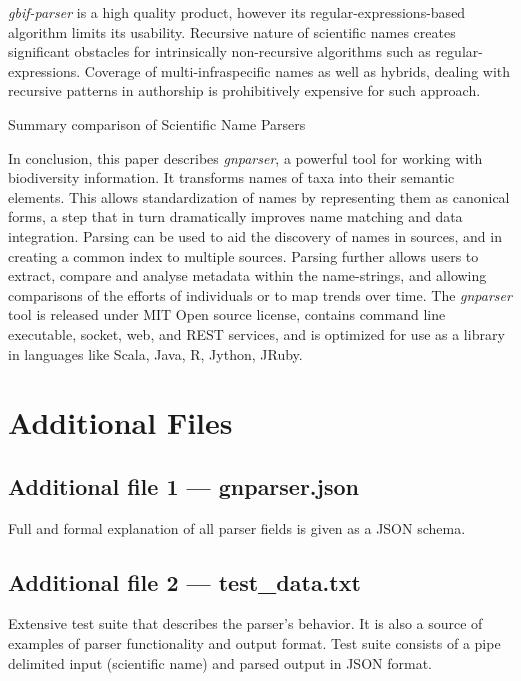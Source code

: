 \documentclass{bmcart}
\begin{document}
\textit{gbif-parser} is a high quality product, however its regular-expressions-based algorithm limits its usability. Recursive nature of scientific names creates significant obstacles for intrinsically non-recursive algorithms such as regular-expressions. Coverage of multi-infraspecific names as well as hybrids, dealing with recursive patterns in authorship is prohibitively expensive for such approach.

\begin{table}[htb]
  \begin{center}
    \caption{Summary comparison of Scientific Name Parsers}
    \label{table:summary}
  \end{center}
\end{table}

In conclusion, this paper describes \textit{gnparser}, a powerful tool for working with biodiversity information. It transforms names of taxa into their semantic elements. This  allows standardization of names by representing them as canonical forms, a step that in turn dramatically improves name matching and data integration. Parsing can be used to aid the discovery of names in sources, and in creating a common index to multiple sources. Parsing further allows users to extract, compare and analyse metadata within the name-strings, and allowing comparisons of the efforts of individuals or to map trends over time. The \textit{gnparser} tool is released under MIT Open source license, contains command line executable, socket, web, and REST services, and is optimized for use as a library in languages like Scala, Java, R, Jython, JRuby.

\section*{Additional Files}

  \subsection*{Additional file 1 --- gnparser.json} Full and formal explanation of all parser fields is given as a JSON schema.

  \subsection*{Additional file 2 --- test\_data.txt} Extensive test suite that describes the parser's behavior. It is also a source of examples of parser functionality and output format.  Test suite consists of a pipe delimited input (scientific name) and parsed output in JSON format.
\end{document}

